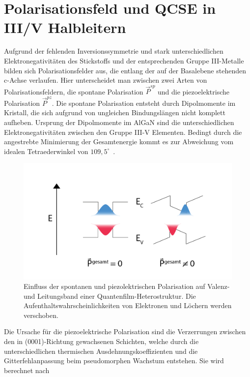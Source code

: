 \section{Polarisationsfeld und QCSE in III/V Halbleitern}

Aufgrund der fehlenden Inversionssymmetrie und stark unterschiedlichen Elektronegativitäten des Stickstoffs und der entsprechenden Gruppe III-Metalle bilden sich Polarisationsfelder aus, die entlang der auf der Basalebene stehenden c-Achse verlaufen. 
\newline
\newline
Hier unterscheidet man zwischen zwei Arten von Polarisationsfeldern, die spontane Polarisation $ \vec{P}^{sp} $ und die piezoelektrische Polarisation $ \vec{P}^{pz} $. 
Die spontane Polarisation entsteht durch Dipolmomente im Kristall, die sich aufgrund von ungleichen Bindungslängen nicht komplett aufheben. 
\newline
Ursprung der Dipolmomente im AlGaN sind die unterschiedlichen Elektronegativitäten zwischen den Gruppe III-V Elementen. Bedingt durch die angestrebte Minimierung der Gesamtenergie kommt es zur Abweichung vom idealen Tetraederwinkel von $109,5^{\circ}$~\cite{ambacher2002}.
%
\begin{figure}[htb]
    \centering
    \begin{minipage}[t]{1.0\linewidth}
        \centering
        \includegraphics[width=0.7\linewidth]{Bilder/QCSE.png}
    \end{minipage}%
    \caption{Einfluss der spontanen und piezolektrischen Polarisation auf Valenz- und Leitungsband einer Quantenfilm-Heterostruktur. Die Aufenthaltswahrscheinlichkeiten von Elektronen und Löchern werden verschoben.}
        \label{fig:qcse}
\end{figure}
\noindent
Die Ursache für die piezoelektrische Polarisation sind die Verzerrungen zwischen den in (0001)-Richtung gewachsenen Schichten, welche durch die unterschiedlichen thermischen Ausdehnungskoeffizienten und die Gitterfehlanpassung beim pseudomorphen Wachstum entstehen. Sie wird berechnet nach
